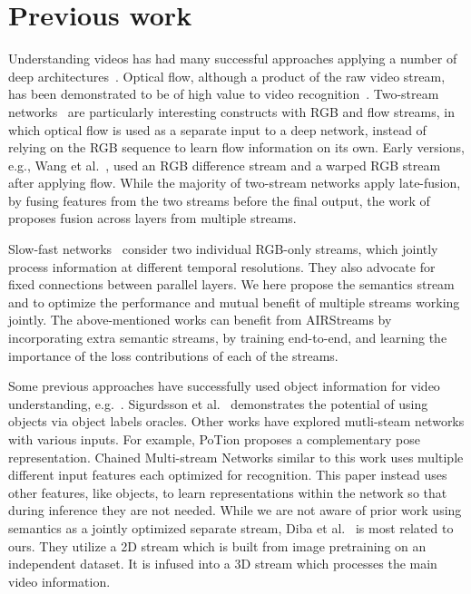 \documentclass[final]{cvpr}
\begin{document}
\section{Previous work}

Understanding videos has had many successful approaches applying a number of deep architectures~\cite{wang2011action,tran2014c3d,simonyan2014two,Feichtenhofer2016Spatiotemporal,Wang2016apperance,kay2017kinetics,xie2018rethinking,carreira2017quo,tran2018closer,fan2018e2e,feichtenhofer2018slowfast}. 
Optical flow, although a product of the raw video stream, has been demonstrated to be of high value to video recognition~\cite{sevillalara2018on}.
Two-stream networks~\cite{simonyan2014two,carreira2017quo,feichtenhofer2016convolutional} are particularly interesting constructs with RGB and flow streams, in which optical flow is used as a separate  input to a deep network, instead of relying on the RGB sequence to learn flow information on its own.  
Early versions, e.g., Wang et al.~\cite{wang2016temporal}, used an RGB difference stream and a warped RGB stream after applying flow.
While the majority of two-stream networks apply late-fusion, by fusing features from the two streams before the final output, the work of ~\cite{Feichtenhofer2016Spatiotemporal} proposes fusion across layers from multiple streams.




Slow-fast networks~\cite{feichtenhofer2018slowfast} consider two individual RGB-only streams, which jointly process information at different temporal resolutions. They also advocate for fixed connections between parallel layers.
We here propose the semantics stream and to optimize the performance and mutual benefit of multiple streams working jointly.
The above-mentioned works can benefit from AIRStreams by incorporating extra semantic streams, by training end-to-end, and learning the importance of the loss contributions of each of the streams.


Some previous approaches have successfully used object information for video understanding, e.g.~\cite{xu2015can,kalogeiton2017joint,ji2018e2e,ray2018SOA,jain2015what,wang2016two,mettes2017spatial,baradel2018object,videoasgraph}.
Sigurdsson et al.~\cite{sigurdsson2017what} demonstrates the potential of using objects via object labels oracles. Other works have explored mutli-steam networks with various inputs. For example, PoTion \cite{choutas2018potion} proposes a complementary pose representation. Chained Multi-stream Networks  \cite{chained} similar to this work uses multiple different input features each optimized for recognition. This paper instead uses other features, like objects, to learn representations within the network so that during inference they are not needed.
While we are not aware of prior work using semantics as a jointly optimized separate stream, Diba et al.~\cite{diba2019holistic} is most related to ours. They utilize a 2D stream which is built from image pretraining on an independent dataset. It is infused into a 3D stream which processes the main video information. 
\end{document}
